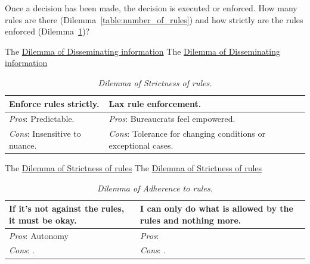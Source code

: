 Once a decision has been made, the decision is executed or enforced. How many rules are there (Dilemma~\ref{table:number_of_rules}) and
how strictly are the rules enforced (Dilemma~\ref{table:rule_strictness})?

The \href{table:disseminate_one-by-one}{Dilemma of Disseminating information}
The \href{table:disseminate_one-by-one}{Dilemma of Disseminating information}


\begin{center}
\begin{table}[H] %
\begin{tabular}{ | m{\dilemmatablewidth}| m{\dilemmatablewidth} | } 
  \hline
  \textbf{Enforce rules strictly.} & 
  \textbf{Lax rule enforcement.} \\ 
  \hline
  \textit{Pros}: Predictable. &
  \textit{Pros}: Bureaucrats feel empowered. \\
  \hline
  \textit{Cons}: Insensitive to nuance. & 
  \textit{Cons}: Tolerance for changing conditions or exceptional cases.  \\  
  \hline
\end{tabular}
\caption{
\textit{Dilemma of Strictness of rules.}
}
\label{table:rule_strictness}
\end{table}
\end{center}

The \href{table:rule_strictness}{Dilemma of Strictness of rules}
The \href{table:rule_strictness}{Dilemma of Strictness of rules}


\begin{center}
\begin{table}[H] %
\begin{tabular}{ | m{\dilemmatablewidth}| m{\dilemmatablewidth} | } 
  \hline
  \textbf{If it's not against the rules, it must be okay.} & 
  \textbf{I can only do what is allowed by the rules and nothing more.} \\ 
  \hline
  \textit{Pros}: Autonomy &
  \textit{Pros}:  \\
  \hline
  \textit{Cons}: . & 
  \textit{Cons}: .  \\  
  \hline
\end{tabular}
\caption{
\textit{Dilemma of Adherence to rules.}
}
\label{table:rule_adherence}
\end{table}
\end{center}


